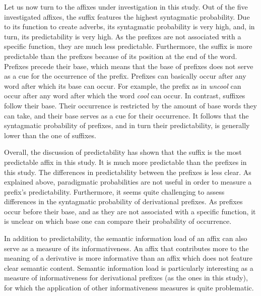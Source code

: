 {  
Let us now turn to the affixes under investigation in this study. Out of the five investigated affixes, the suffix  features the highest syntagmatic probability. Due to its function to create adverbs, its syntagmatic probability is very high, and, in turn, its predictability is very high. As the prefixes are not associated with a specific function, they are much less predictable.  
Furthermore, the suffix  is more predictable than the prefixes because of its position at the end of the word. 
 Prefixes precede their base, which means that the base of prefixes does not serve as a cue for the occurrence of the prefix. Prefixes can basically occur after any word after which its base can occur. 
 For example, the prefix  as in \textit{uncool} can occur after any word after which the word \textit{cool} can occur. 
 In contrast, suffixes follow their base. Their occurrence is restricted by the amount of base words they can take,  and their base serves as a cue for their occurrence.
 It follows that the syntagmatic probability of prefixes, and in turn their predictability, is generally lower than the one of suffixes. 
 
Overall, the discussion of predictability has shown that the suffix  is the most predictable affix in this study. It is much more predictable than the prefixes in this study. The differences in predictability between the prefixes is less clear. As explained above, paradigmatic probabilities are not useful in order to measure a prefix's predictability. Furthermore, it seems quite challenging to assess differences in the syntagmatic probability of derivational prefixes. As prefixes occur before their base, and as they are not associated with a specific function, it is unclear on which base one can compare their probability of occurrence.





In addition to predictability, the semantic information load of an affix can also serve as a measure of its informativeness. An affix that contributes more to the meaning of a derivative is more informative than an affix which does not feature clear semantic content. Semantic information load is particularly interesting as a measure of informativeness for derivational prefixes (as the ones in this study), for which the application of other informativeness measures is quite problematic. 

}
